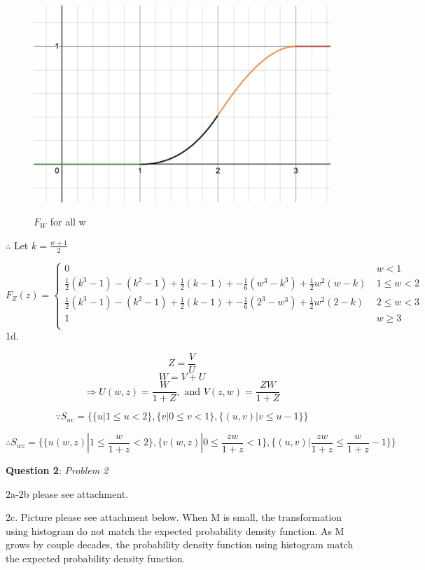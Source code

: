 \documentclass{article} %
\newcommand{\question}[2][]{\begin{flushleft}
        \textbf{Question #1}: \textit{#2}

\end{flushleft}}
\begin{document}
    \begin{figure}[]
        \centering
        \includegraphics[scale=0.20]{HW/HW4/p1c_fw.jpg}
        \label{fig:$F_W,all$}
        \caption{$F_W$ for all w}    
    \end{figure}

    $\therefore$ Let $k=\frac{w+1}{2}$
    
    $F_Z(z) = \left\{ \begin{array}{cl}
        0  &  \ w < 1 \\
        \frac{1}{2}(k^3-1)-(k^2-1)+\frac{1}{2}(k-1)+-\frac{1}{6}(w^3-k^3)+\frac{1}{2}w^2(w-k) &  \ 1 \leq w < 2 \\
        \frac{1}{2}(k^3-1)-(k^2-1)+\frac{1}{2}(k-1)+-\frac{1}{6}(2^3-w^3)+\frac{1}{2}w^2(2-k)  &  \ 2 \leq w < 3 \\
        1 &  \ w \geq 3 \\
        \end{array} \right.$
\newpage
    1d.

    $$Z = \frac{V}{U}$$
    $$W = V+U$$
    $$\Rightarrow U(w,z)=\frac{W}{1+Z}, \text{ and } V(z,w)=\frac{ZW}{1+Z}$$

    $$\because S_{uv}=\{{\{u| 1 \leq u < 2\},\{v| 0 \leq v < 1\},\{(u,v)| v \leq u-1 \}}\}$$

    $$\therefore S_{wz}=\{{\{u(w,z)| 1 \leq \frac{w}{1+z} < 2\},\{v(w,z)| 0 \leq \frac{zw}{1+z} < 1\},\{(u,v)| \frac{zw}{1+z} \leq \frac{w}{1+z}-1 \}}\}$$
    \question[2]{Problem 2}
    
    2a-2b please see attachment.

    2c. Picture please see attachment below. When M is small, the transformation using histogram do not match the expected probability density function. As M grows by couple decades, the probability density function using histogram match the expected probability density function.  
    
    
\end{document}
